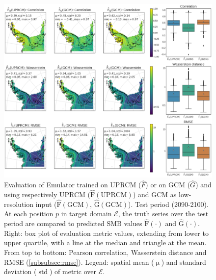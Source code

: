 \documentclass[a4paper,11pt,oneside]{report}
\begin{document}
\begin{figure}[!ht]
  \centering
  \includegraphics[width=\columnwidth]{doc/Thesis-latex/images/results/metrics_RCM_GCM.pdf}
  \caption []{\small Evaluation of Emulator trained on UPRCM ($\hat{F}$) or on GCM ($\hat{G}$) and using respectively UPRCM ($\operatorname{\hat{F}(UPRCM)}$) and GCM as low-resolution input ($\operatorname{\hat{F}(GCM)}$, $\operatorname{\hat{G}(GCM)}$). Test period (2090-2100). At each position $p$ in target domain $\mathcal{E}$, the truth series over the test period are compared to predicted SMB values $\operatorname{\hat{F}(\cdot)}$ and $\operatorname{\hat{G}(\cdot)}$. Right: box plot of evaluation metric values, extending from lower to upper quartile, with a line at the median and triangle at the mean. From top to bottom: Pearson correlation, Wasserstein distance and RMSE (\ref{subsubsec:rmse}). Legend: spatial mean ($\operatorname{\mu}$) and standard deviation ($\operatorname{std}$) of metric over $\mathcal{E}$. }
  \vspace{-3mm}
  \label{fig:evaluation-GCM-RCM}
\end{figure}
\end{document}
